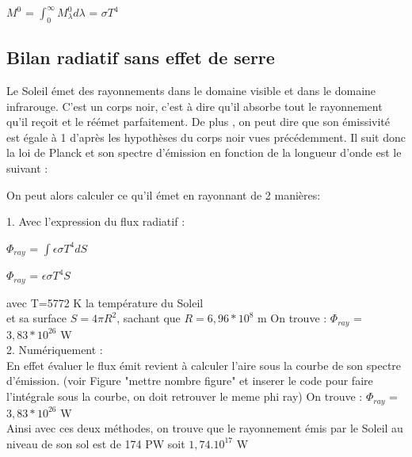 \documentclass[a4paper, 12pt]{report} %
\begin{document}
\hfil $M^{0}$ = $\int_{0}^{\infty} M^{0}_\lambda d\lambda$ = $\sigma T^{4}$ 

\par

\subsection{Bilan radiatif sans effet de serre} 

Le Soleil émet des rayonnements dans le domaine visible et 
dans le domaine infrarouge. C'est un corps noir, c'est à dire
qu'il absorbe tout le rayonnement qu'il reçoit et le réémet 
parfaitement. De plus , on peut dire que son émissivité est 
égale à 1 d'après les hypothèses du corps noir vues précédemment. Il suit donc la loi de Planck et son spectre d'émission en fonction de 
la longueur d'onde est le suivant :


On peut alors calculer ce qu'il émet en rayonnant de 2 manières: \vspace{\baselineskip}

1. Avec l'expression du flux radiatif :
\begin{center}
$\Phi_{ray}$ = $\int \epsilon \sigma T^{4} dS$    
\end{center}
\begin{center}
$\Phi_{ray}$ = $\epsilon \sigma T^{4} S$    
\end{center}
avec T=5772 K la température du Soleil \\
et sa surface $S=4 \pi R^{2}$, sachant que $R= 6,96*10^{8}$ m 
\newline
\newline
On trouve :
$\Phi_{ray}$ = $3,83*10^{26}$ W  \\

2. Numériquement : \\

En effet évaluer le flux émit revient à calculer l'aire sous la courbe de son spectre d'émission. (voir Figure  "mettre nombre figure" et inserer 
le code pour faire l'intégrale sous la courbe, on doit retrouver le meme phi ray) \vspace{\baselineskip}
\newline On trouve :
$\Phi_{ray}$ = $3,83*10^{26}$ W \\

	Ainsi avec ces deux méthodes, on trouve que le rayonnement émis par le Soleil au niveau de son sol
est de 174 PW  soit $1,74.10^{17}$ W
\newline
\newline
\newline
\end{document}
